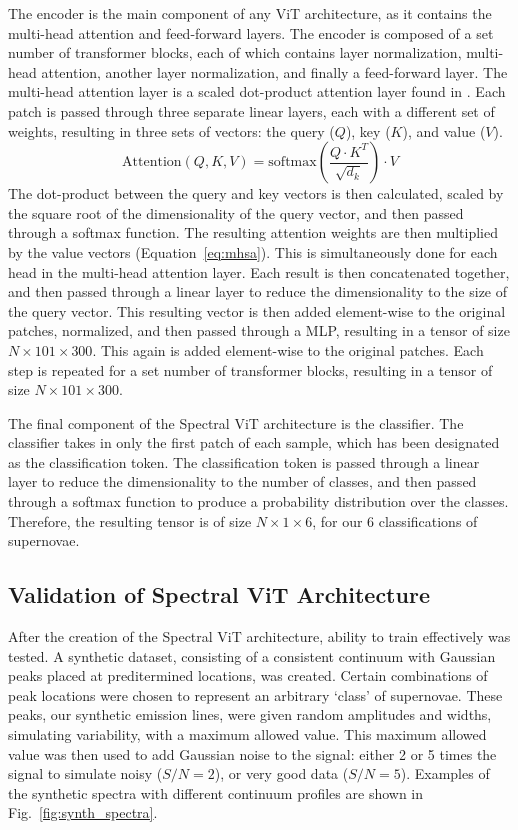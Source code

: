 The encoder is the main component of any ViT architecture, as it contains the 
multi-head attention and feed-forward layers. The encoder is composed of a set number of
transformer blocks, each of which contains layer normalization, multi-head attention, another 
layer normalization, and finally a feed-forward layer. The multi-head attention layer 
is a scaled dot-product attention layer found in \textcite{vaswani2017}. Each patch 
is passed through three separate linear layers, each with a different set of weights, 
resulting in three sets of vectors: the query ($Q$), key ($K$), and value ($V$).
\begin{equation}
    \label{eq:mhsa}
    \text{Attention}(Q, K, V) = \text{softmax}\left(\frac{Q\cdot K^T}{\sqrt{d_k}}\right)\cdot V
\end{equation}
The dot-product between the query and key vectors is then calculated,
scaled by the square root of the dimensionality of the query vector, and then passed through a softmax function.
The resulting attention weights are then multiplied by the value vectors (Equation~\ref{eq:mhsa}). 
This is simultaneously done for each head in the multi-head attention layer. Each result is then 
concatenated together, and then passed through a linear layer to reduce the dimensionality
to the size of the query vector. This resulting vector is then added
element-wise to the original patches, normalized, and then passed through a MLP, 
resulting in a tensor of size $N \times 101 \times 300$. This again is added element-wise to the original patches. 
Each step is repeated for a set number of transformer blocks, resulting in a tensor of size
$N \times 101 \times 300$.

The final component of the Spectral ViT architecture is the classifier. The classifier
takes in only the first patch of each sample, which has been designated as the classification token.
The classification token is passed through a linear layer to reduce the dimensionality to the
number of classes, and then passed through a softmax function to produce a probability distribution
over the classes. Therefore, the resulting tensor is of size $N \times 1 \times 6$, for our 
6 classifications of supernovae.
\subsection{Validation of Spectral ViT Architecture}
\label{ssec:validation}
After the creation of the Spectral ViT architecture, ability to train effectively 
was tested. A synthetic dataset, consisting of a consistent continuum with 
Gaussian peaks placed at preditermined locations, was created. Certain combinations of 
peak locations were chosen to represent an arbitrary `class' of supernovae. These peaks, 
our synthetic emission lines, were given random amplitudes and widths, simulating  
variability, with a maximum allowed value. This maximum allowed value was then used to add 
Gaussian noise to the signal: either 2 or 5 times the signal to simulate noisy ($S/N=2$),
or very good data ($S/N=5$). Examples of the synthetic spectra with different continuum profiles 
are shown in Fig.~\ref{fig:synth_spectra}. 

